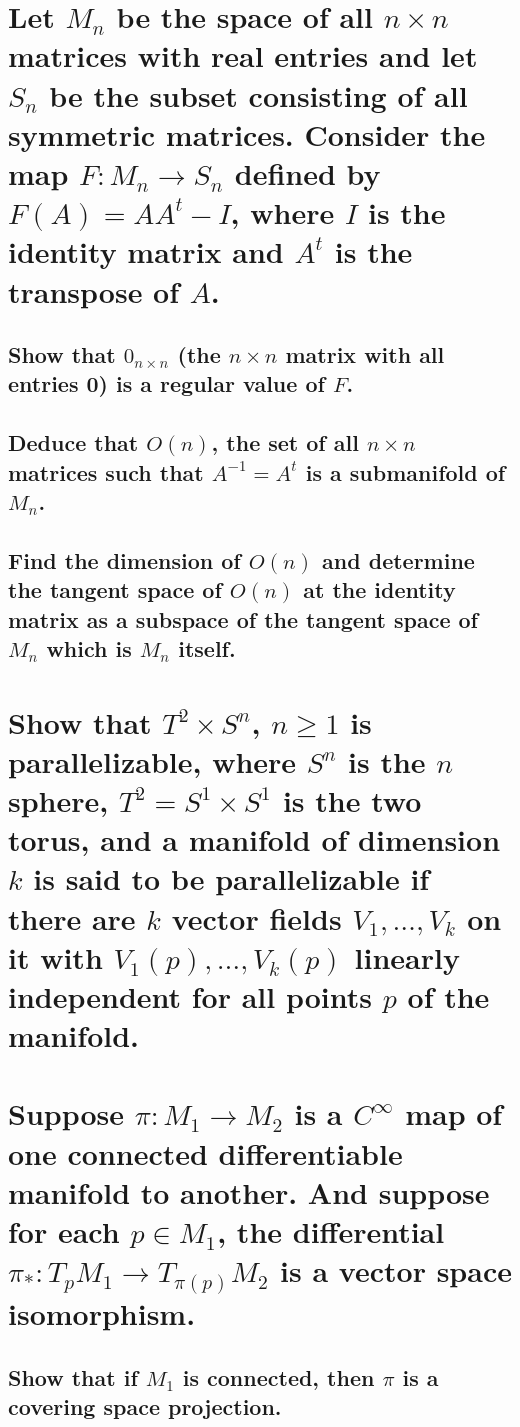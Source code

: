 \documentclass[10pt]{article}
\begin{document}
 

\section{Let $M_n$ be the space of all $n\times n$ matrices with real entries and let $S_n$ be the
  subset consisting of all symmetric matrices. Consider the map $F: M_n \to S_n$ defined by $F(A) =
  A A^t - I$, where $I$ is the identity matrix and $A^t$ is the transpose of $A$.}

\subsection{Show that $0_{n \times n}$ (the $n \times n$ matrix with all entries 0) is a regular
  value of $F$. }

\subsection{Deduce that $O(n)$, the set of all $n \times n$ matrices such that $A^{-1} = A^t$ is a
  submanifold of $M_n$. }

\subsection{Find the dimension of $O(n)$ and determine the tangent space of $O(n)$ at the identity
  matrix as a subspace of the tangent space of $M_n$ which is $M_n$ itself.}

\section{Show that $T^2 \times S^n$, $n \geq 1$ is parallelizable, where $S^n$ is the $n$ sphere,
  $T^2 = S^1 \times S^1$ is the two torus, and a manifold of dimension $k$ is said to be
  parallelizable if there are $k$ vector fields $V_1, \dots, V_k$ on it with $V_1(p), \dots, V_k(p)$
  linearly independent for all points $p$ of the manifold.}

\section{Suppose $\pi : M_1 \to M_2$ is a $C^\infty$ map of one connected differentiable manifold to
  another. And suppose for each $p \in M_1$, the differential $\pi_* :T_pM_1 \to T_{\pi(p)} M_2$ is a vector
  space isomorphism.}

\subsection{Show that if $M_1$ is connected, then $\pi$ is a covering space projection.}
\end{document}
